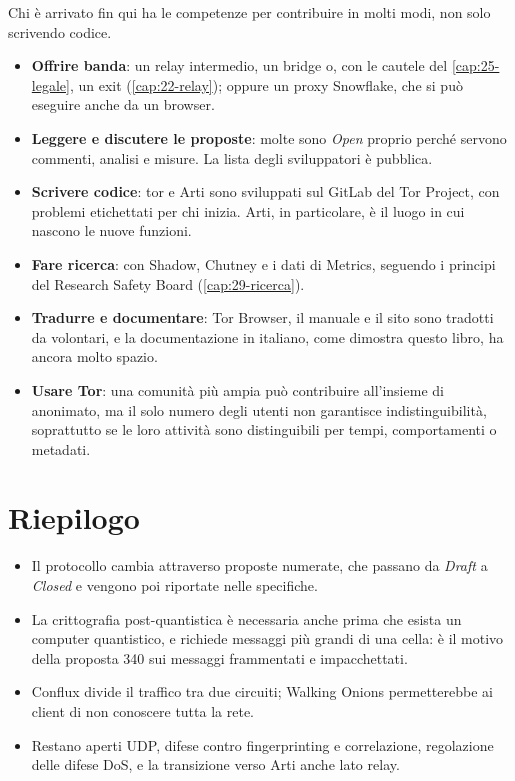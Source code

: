 Chi è arrivato fin qui ha le competenze per contribuire in molti modi, non solo scrivendo codice.
\begin{itemize}
  \item \textbf{Offrire banda}: un relay intermedio, un bridge o, con le cautele del \cref{cap:25-legale}, un exit (\cref{cap:22-relay}); oppure un proxy Snowflake, che si può eseguire anche da un browser.
  \item \textbf{Leggere e discutere le proposte}: molte sono \emph{Open} proprio perché servono commenti, analisi e misure. La lista degli sviluppatori è pubblica.
  \item \textbf{Scrivere codice}: tor e Arti sono sviluppati sul GitLab del Tor Project, con problemi etichettati per chi inizia. Arti, in particolare, è il luogo in cui nascono le nuove funzioni.
  \item \textbf{Fare ricerca}: con Shadow, Chutney e i dati di Metrics, seguendo i principi del Research Safety Board (\cref{cap:29-ricerca}).
  \item \textbf{Tradurre e documentare}: Tor Browser, il manuale e il sito sono tradotti da volontari, e la documentazione in italiano, come dimostra questo libro, ha ancora molto spazio.
  \item \textbf{Usare Tor}: una comunità più ampia può contribuire all'insieme di anonimato, ma il solo numero degli utenti non garantisce indistinguibilità, soprattutto se le loro attività sono distinguibili per tempi, comportamenti o metadati.
\end{itemize}

\section*{Riepilogo}
\begin{itemize}
  \item Il protocollo cambia attraverso proposte numerate, che passano da \emph{Draft} a \emph{Closed} e vengono poi riportate nelle specifiche.
  \item La crittografia post-quantistica è necessaria anche prima che esista un computer quantistico, e richiede messaggi più grandi di una cella: è il motivo della proposta 340 sui messaggi frammentati e impacchettati.
  \item Conflux divide il traffico tra due circuiti; Walking Onions permetterebbe ai client di non conoscere tutta la rete.
  \item Restano aperti UDP, difese contro fingerprinting e correlazione, regolazione delle difese DoS, e la transizione verso Arti anche lato relay.
\end{itemize}

